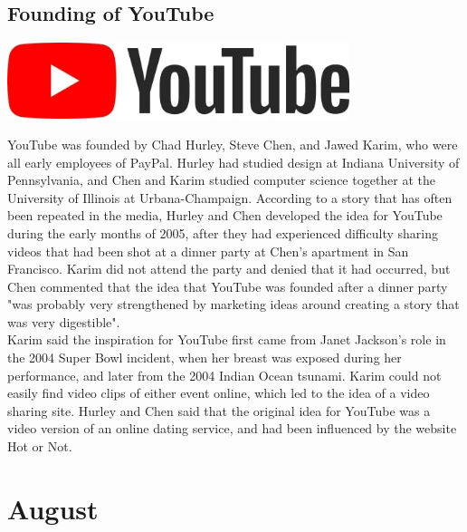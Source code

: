 \documentclass[11pt]{report}
\begin{document}
\subsection{Founding of YouTube}
\begin{center}\includegraphics[width=10cm]{./img/youtubeLogo.jpg}\end{center}
YouTube was founded by Chad Hurley, Steve Chen, and Jawed Karim, who were all early employees of PayPal. Hurley had studied design at Indiana University of Pennsylvania, and Chen and Karim studied computer science together at the University of Illinois at Urbana-Champaign. According to a story that has often been repeated in the media, Hurley and Chen developed the idea for YouTube during the early months of 2005, after they had experienced difficulty sharing videos that had been shot at a dinner party at Chen's apartment in San Francisco. Karim did not attend the party and denied that it had occurred, but Chen commented that the idea that YouTube was founded after a dinner party "was probably very strengthened by marketing ideas around creating a story that was very digestible".\\
\indent Karim said the inspiration for YouTube first came from Janet Jackson's role in the 2004 Super Bowl incident, when her breast was exposed during her performance, and later from the 2004 Indian Ocean tsunami. Karim could not easily find video clips of either event online, which led to the idea of a video sharing site. Hurley and Chen said that the original idea for YouTube was a video version of an online dating service, and had been influenced by the website Hot or Not.
\section{August}
\end{document}
